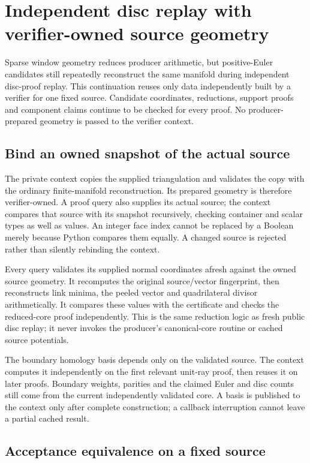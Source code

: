 \section{Independent disc replay with verifier-owned source geometry}
\label{sec:disc-context}

Sparse window geometry reduces producer arithmetic, but positive-Euler
candidates still repeatedly reconstruct the same manifold during independent
disc-proof replay. This continuation reuses only data independently built
by a verifier for one fixed source. Candidate coordinates, reductions,
support proofs and component claims continue to be checked for every proof.
No producer-prepared geometry is passed to the verifier context.

\subsection{Bind an owned snapshot of the actual source}

The private context copies the supplied triangulation and validates the copy
with the ordinary finite-manifold reconstruction. Its prepared geometry is
therefore verifier-owned. A proof query also supplies its actual source;
the context compares that source with its snapshot recursively, checking
container and scalar types as well as values. An integer face index cannot
be replaced by a Boolean merely because Python compares them equally.
A changed source is rejected rather than silently rebinding the context.

Every query validates its supplied normal coordinates afresh against the
owned source geometry. It recomputes the original source/vector fingerprint,
then reconstructs link minima, the peeled vector and quadrilateral divisor
arithmetically. It compares these values with the certificate and checks
the reduced-core proof independently. This is the same reduction logic as
fresh public disc replay; it never invokes the producer's canonical-core
routine or cached source potentials.

The boundary homology basis depends only on the validated source. The
context computes it independently on the first relevant unit-ray proof,
then reuses it on later proofs. Boundary weights, parities and the claimed
Euler and disc counts still come from the current independently validated
core. A basis is published to the context only after complete construction;
a callback interruption cannot leave a partial cached result.

\subsection{Acceptance equivalence on a fixed source}

